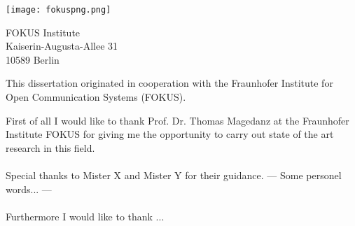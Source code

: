 \thispagestyle{empty}
\vspace*{3cm}


\begin{center}
\texttt{[image: fokuspng.png]}
\end{center}

\vspace*{0.2cm}

\begin{center}
FOKUS Institute\\
Kaiserin-Augusta-Allee 31\\
10589 Berlin\\
\end{center}
\vspace*{0.5cm}

\noindent This dissertation originated in cooperation with the Fraunhofer Institute for Open Communication Systems (FOKUS).

\vspace*{1cm}
\noindent 
First of all I would like to thank Prof. Dr. Thomas Magedanz at the Fraunhofer Institute FOKUS for giving me the opportunity to carry out state of the art research in this field. 
\\
\\
Special thanks to Mister X and Mister Y for their guidance. --- Some personel words... ---
\\
\\
Furthermore I would like to thank ...